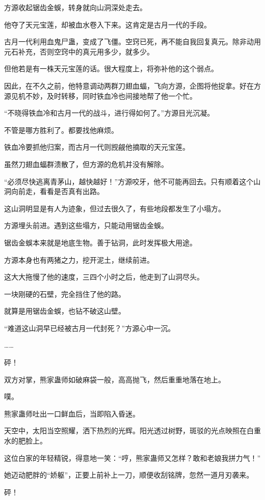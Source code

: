 \begin{this_body}
方源收起锯齿金蜈，转身就向山洞深处走去。

他夺了天元宝莲，却被血水卷入下来。这肯定是古月一代的手段。

古月一代利用血鬼尸蛊，变成了飞僵。空窍已死，再不能自我回复真元。除非动用元石补充，否则空窍中的真元用多少，就多少。

但他若是有一株天元宝莲的话。很大程度上，将弥补他的这个弱点。

因此，在不久之前，他特意调动两群刀翅血蝠，飞向方源，企图将他捉拿。好在方源见机不妙，及时转移，同时铁血冷也间接地帮了他一个忙。

“不晓得铁血冷和古月一代的战斗，进行得如何了。”方源目光沉凝。

不管是哪方胜利了。都要找他麻烦。

铁血冷要抓他归案，而古月一代则觊觎他摘取的天元宝莲。

虽然刀翅血蝠群溃散了，但方源的危机并没有解除。

“必须尽快逃离青茅山，越快越好！”方源咬牙，他不可能再回去。只有顺着这个山洞向前走，看看是否真有出路。

这山洞明显是有人为迹象，但过去很久了，有些地段都发生了小塌方。

方源埋头前进。遇到这些塌方，只能动用锯齿金蜈。

锯齿金蜈本来就是地底生物。善于钻洞，此时发挥极大用途。

方源本身也有两猪之力，挖开泥土，继续前进。

这大大拖慢了他的速度，三四个小时之后，他走到了山洞尽头。

一块刚硬的石壁，完全挡住了他的路。

就算是用锯齿金蜈，也钻不破这山壁。

“难道这山洞早已经被古月一代封死？”方源心中一沉。

……

砰！

双方对掌，熊家蛊师如破麻袋一般，高高抛飞，然后重重地落在地上。

噗。

熊家蛊师吐出一口鲜血后，当即陷入昏迷。

天空中，太阳当空照耀，洒下热烈的光辉。阳光透过树野，斑驳的光点映照在白重水的肥脸上。

这位白家的年轻精锐，得意地一笑：“哼，熊家蛊师又怎样？敢和老娘我拼力气！”

她迈动肥胖的“娇躯”，正要上前补上一刀，顺便收刮铭牌，忽然一道月刃袭来。

砰！


\end{this_body}

